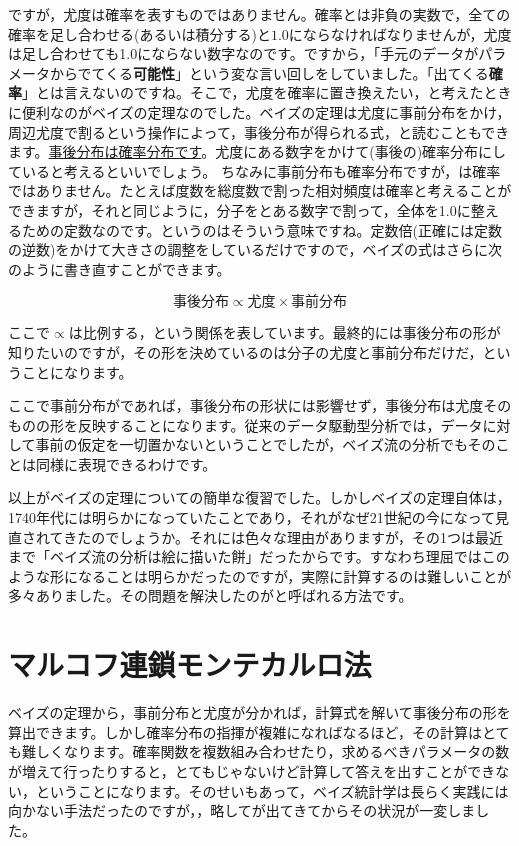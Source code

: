 \documentclass{ltjsbook}
\begin{document}
ですが，尤度は確率を表すものではありません。確率とは非負の実数で，全ての確率を足し合わせる(あるいは積分する)と$1.0$にならなければなりませんが，尤度は足し合わせても1.0にならない数字なのです。ですから，「手元のデータがパラメータからでてくる\textbf{可能性}」という変な言い回しをしていました。「出てくる\textbf{確率}」とは言えないのですね。そこで，尤度を確率に置き換えたい，と考えたときに便利なのがベイズの定理なのでした。ベイズの定理は尤度に事前分布をかけ，周辺尤度で割るという操作によって，事後分布が得られる式，と読むこともできます。\underline{事後分布は確率分布です}。尤度にある数字をかけて(事後の)確率分布にしていると考えるといいでしょう。
ちなみに事前分布も確率分布ですが，は確率ではありません。たとえば度数を総度数で割った相対頻度は確率と考えることができますが，それと同じように，分子をとある数字で割って，全体を1.0に整えるための定数なのです。というのはそういう意味ですね。定数倍(正確には定数の逆数)をかけて大きさの調整をしているだけですので，ベイズの式はさらに次のように書き直すことができます。

$$ \mbox{事後分布} \propto \mbox{尤度}\times \mbox{事前分布} $$

ここで$\propto$は比例する，という関係を表しています。最終的には事後分布の形が知りたいのですが，その形を決めているのは分子の尤度と事前分布だけだ，ということになります。

ここで事前分布がであれば，事後分布の形状には影響せず，事後分布は尤度そのものの形を反映することになります。従来のデータ駆動型分析では，データに対して事前の仮定を一切置かないということでしたが，ベイズ流の分析でもそのことは同様に表現できるわけです。

以上がベイズの定理についての簡単な復習でした。しかしベイズの定理自体は，1740年代には明らかになっていたことであり，それがなぜ21世紀の今になって見直されてきたのでしょうか。それには色々な理由がありますが，その1つは最近まで「ベイズ流の分析は絵に描いた餅」だったからです。すなわち理屈ではこのような形になることは明らかだったのですが，実際に計算するのは難しいことが多々ありました。その問題を解決したのがと呼ばれる方法です。

\section{マルコフ連鎖モンテカルロ法}

ベイズの定理から，事前分布と尤度が分かれば，計算式を解いて事後分布の形を算出できます。しかし確率分布の指揮が複雑になればなるほど，その計算はとても難しくなります。確率関数を複数組み合わせたり，求めるべきパラメータの数が増えて行ったりすると，とてもじゃないけど計算して答えを出すことができない，ということになります。そのせいもあって，ベイズ統計学は長らく実践には向かない手法だったのですが，，略してが出てきてからその状況が一変しました。
\end{document}
